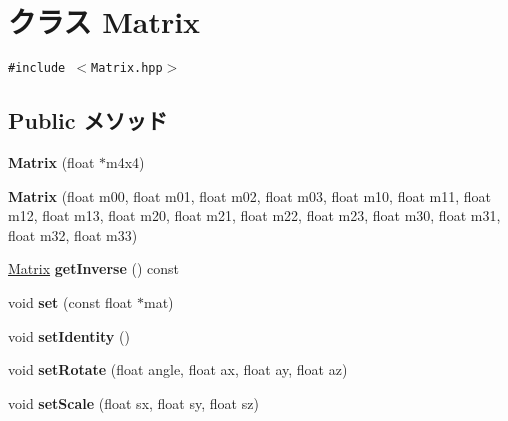 \hypertarget{classm3g_1_1Matrix}{
\section{クラス Matrix}
\label{classm3g_1_1Matrix}
}
{\tt \#include $<$Matrix.hpp$>$}

\subsection*{Public メソッド}
\begin{CompactItemize}
\item 
\hypertarget{classm3g_1_1Matrix_04fd433badb74a2d60395217701d4009}{
\textbf{Matrix} (float $\ast$m4x4)}
\label{classm3g_1_1Matrix_04fd433badb74a2d60395217701d4009}

\item 
\hypertarget{classm3g_1_1Matrix_2c2f600f3a4c1db4a0da0b57db8aebca}{
\textbf{Matrix} (float m00, float m01, float m02, float m03, float m10, float m11, float m12, float m13, float m20, float m21, float m22, float m23, float m30, float m31, float m32, float m33)}
\label{classm3g_1_1Matrix_2c2f600f3a4c1db4a0da0b57db8aebca}

\item 
\hypertarget{classm3g_1_1Matrix_b26f91cb9ae99fad922140d93b886009}{
\hyperlink{classm3g_1_1Matrix}{Matrix} \textbf{getInverse} () const }
\label{classm3g_1_1Matrix_b26f91cb9ae99fad922140d93b886009}

\item 
\hypertarget{classm3g_1_1Matrix_ed427d2cd38fe4a0b23f7f80803b7fd5}{
void \textbf{set} (const float $\ast$mat)}
\label{classm3g_1_1Matrix_ed427d2cd38fe4a0b23f7f80803b7fd5}

\item 
\hypertarget{classm3g_1_1Matrix_382e6ad7e6721b121e510959e1011be3}{
void \textbf{setIdentity} ()}
\label{classm3g_1_1Matrix_382e6ad7e6721b121e510959e1011be3}

\item 
\hypertarget{classm3g_1_1Matrix_c4e04770db1fedff14c37b5e4e4a68c6}{
void \textbf{setRotate} (float angle, float ax, float ay, float az)}
\label{classm3g_1_1Matrix_c4e04770db1fedff14c37b5e4e4a68c6}

\item 
\hypertarget{classm3g_1_1Matrix_937d04042c25021532ea2532fe5e3a32}{
void \textbf{setScale} (float sx, float sy, float sz)}
\label{classm3g_1_1Matrix_937d04042c25021532ea2532fe5e3a32}


\end{CompactItemize}
